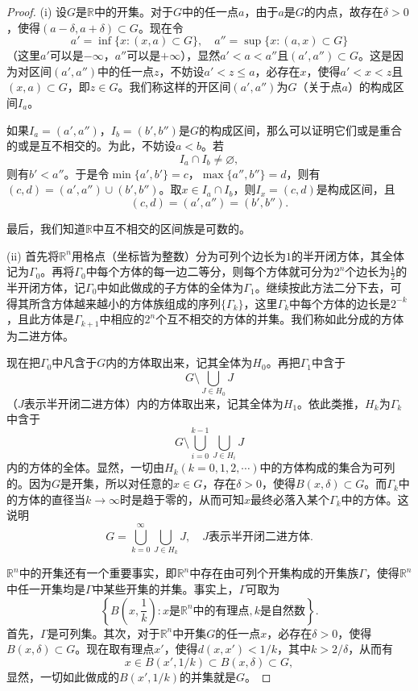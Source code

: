 \documentclass[lang=cn,newtx,10pt,scheme=chinese]{../Template/elegantbook}
\begin{document}
\begin{proof}
  (i) 设\(G\)是\(\mathbb{R}\)中的开集。对于\(G\)中的任一点\(a\)，由于\(a\)是\(G\)的内点，故存在\(\delta>0\)，使得\((a - \delta,a + \delta)\subset G\)。现在令
\[a'=\inf\{x:(x,a)\subset G\},\quad a''=\sup\{x:(a,x)\subset G\}\]
（这里\(a'\)可以是\(-\infty\)，\(a''\)可以是\(+\infty\)），显然\(a'<a<a''\)且\((a',a'')\subset G\)。这是因为对区间\((a',a'')\)中的任一点\(z\)，不妨设\(a'<z\leqslant a\)，必存在\(x\)，使得\(a'<x<z\)且\((x,a)\subset G\)，即\(z\in G\)。我们称这样的开区间\((a',a'')\)为\(G\)（关于点\(a\)）的构成区间\(I_a\)。

如果\(I_a=(a',a'')\)，\(I_b=(b',b'')\)是\(G\)的构成区间，那么可以证明它们或是重合的或是互不相交的。为此，不妨设\(a < b\)。若
\[I_a\cap I_b\neq\varnothing,\]
则有\(b'<a''\)。于是令\(\min\{a',b'\}=c\)，\(\max\{a'',b''\}=d\)，则有\((c,d)=(a',a'')\cup(b',b'')\)。取\(x\in I_a\cap I_b\)，则\(I_x=(c,d)\)是构成区间，且
\[(c,d)=(a',a'')=(b',b'').\]

最后，我们知道\(\mathbb{R}\)中互不相交的区间族是可数的。

(ii) 首先将\(\mathbb{R}^n\)用格点（坐标皆为整数）分为可列个边长为\(1\)的半开闭方体，其全体记为\(\Gamma_0\)。再将\(\Gamma_0\)中每个方体的每一边二等分，则每个方体就可分为\(2^n\)个边长为\(\frac{1}{2}\)的半开闭方体，记\(\Gamma_0\)中如此做成的子方体的全体为\(\Gamma_1\)。继续按此方法二分下去，可得其所含方体越来越小的方体族组成的序列\(\{\Gamma_k\}\)，这里\(\Gamma_k\)中每个方体的边长是\(2^{-k}\)，且此方体是\(\Gamma_{k + 1}\)中相应的\(2^n\)个互不相交的方体的并集。我们称如此分成的方体为二进方体。

现在把\(\Gamma_0\)中凡含于\(G\)内的方体取出来，记其全体为\(H_0\)。再把\(\Gamma_1\)中含于
\[G\setminus\bigcup_{J\in H_0}J\]
（\(J\)表示半开闭二进方体）内的方体取出来，记其全体为\(H_1\)。依此类推，\(H_k\)为\(\Gamma_k\)中含于
\[G\setminus\bigcup_{i = 0}^{k - 1}\bigcup_{J\in H_i}J\]
内的方体的全体。显然，一切由\(H_k(k = 0,1,2,\cdots)\)中的方体构成的集合为可列的。因为\(G\)是开集，所以对任意的\(x\in G\)，存在\(\delta>0\)，使得\(B(x,\delta)\subset G\)。而\(\Gamma_k\)中的方体的直径当\(k\rightarrow\infty\)时是趋于零的，从而可知\(x\)最终必落入某个\(\Gamma_k\)中的方体。这说明
\[G=\bigcup_{k = 0}^{\infty}\bigcup_{J\in H_k}J,\quad J表示半开闭二进方体.\]

\(\mathbb{R}^n\)中的开集还有一个重要事实，即\(\mathbb{R}^n\)中存在由可列个开集构成的开集族\(\Gamma\)，使得\(\mathbb{R}^n\)中任一开集均是\(\Gamma\)中某些开集的并集。事实上，\(\Gamma\)可取为
\[\left\{B\left(x,\frac{1}{k}\right):x是\mathbb{R}^n中的有理点,k是自然数\right\}.\]
首先，\(\Gamma\)是可列集。其次，对于\(\mathbb{R}^n\)中开集\(G\)的任一点\(x\)，必存在\(\delta>0\)，使得\(B(x,\delta)\subset G\)。现在取有理点\(x'\)，使得\(d(x,x')<1/k\)，其中\(k > 2/\delta\)，从而有
\[x\in B(x',1/k)\subset B(x,\delta)\subset G,\]
显然，一切如此做成的\(B(x',1/k)\)的并集就是\(G\)。
\end{proof}
\end{document}
